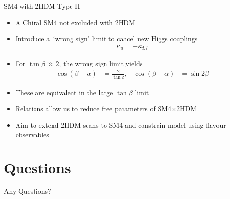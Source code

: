 \documentclass[10pt,xcolor={table,dvipsnames},t]{beamer}
\begin{document}
\begin{frame}{SM4 with 2HDM Type II}
    \begin{itemize}
        \item A Chiral SM4 not excluded with 2HDM 
        \item Introduce a ``wrong sign" limit to cancel new Higgs couplings
            \begin{align}
                \kappa_u = -\kappa_{d,l}
            \end{align}
        \item For $\tan\beta\gg2$, the wrong sign limit yields
            \begin{align}
                \cos(\beta-\alpha) &= \frac{2}{\tan\beta}, & \cos(\beta-\alpha) &= \sin2\beta
            \end{align}
        \item These are equivalent in the large $\tan\beta$ limit
        \item Relations allow us to reduce free parameters of SM4$\times$2HDM
        \item Aim to extend 2HDM scans to SM4 and constrain model using flavour observables
    \end{itemize}
\end{frame}

\section{Questions}
\begin{frame}
    \begin{center}
        \vspace{60pt}
        \Huge Any Questions?
    \end{center}
\end{frame}
\end{document}
